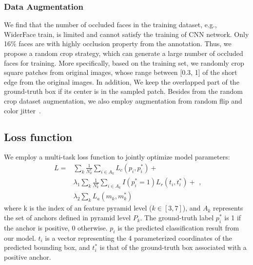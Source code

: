 \documentclass[10pt,twocolumn,letterpaper]{article}
\begin{document}
\subsubsection{Data Augmentation\label{sec:data_aug}}
We find that the number of occluded faces in the training dataset, e.g., WiderFace train, is limited and cannot satisfy the training of CNN network.
Only 16\% faces are with highly occlusion property from the annotation. Thus, we propose a random crop strategy, which can generate a large number of occluded faces for training. More specifically, based on the training set,  we randomly crop square patches from original images, whose range between [0.3, 1] of the short edge from the original images. In addition, We keep the overlapped part of the ground-truth box if its center is in the sampled patch. Besides from the random crop dataset augmentation, we also employ augmentation from random flip and color jitter~\cite{zhang2017s3fd}.



\subsection{Loss function}\label{sec:training}



We employ a multi-task loss function to jointly optimize model parameters:
\begin{equation}
\begin{aligned} L=&\sum_k{\frac{1}{N_k^c}\sum_{i\in A_k}{L_c(p_i, p_i^*)}}+\\
&\lambda_1\sum_k{\frac{1}{N_k^r}\sum_{i\in A_k}{I(p_i^*=1)L_r(t_i, t_i^*)}}+\\
&\lambda_2\sum_k{L_a(m_k, m_k^*)} \end{aligned},
\end{equation}
where k is the index of an feature pyramid level ($ k\in[3, 7] $), and $ A_k $ represents the set of anchors defined in pyramid level $ P_k $. The ground-truth label $ p_i^* $ is 1 if the anchor is positive, 0 otherwise. $ p_i$ is the predicted classification result from our model. $ t_i $ is a vector representing the 4 parameterized coordinates of the predicted bounding box, and $ t_i^* $ is that of the ground-truth box associated with a positive anchor. 
\end{document}
